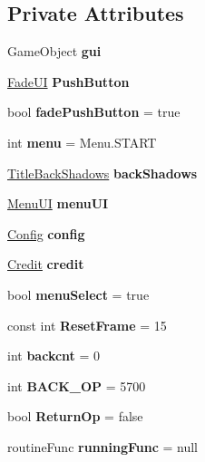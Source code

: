 \subsection*{Private Attributes}
\begin{DoxyCompactItemize}
\item 
\mbox{\label{class_title_acfb1043fc68240498ed922ee90c5c933}} 
Game\+Object {\bfseries gui}
\item 
\mbox{\label{class_title_a0a7333da44745f3f460ddd75d0d77764}} 
\hyperlink{class_fade_u_i}{Fade\+UI} {\bfseries Push\+Button}
\item 
\mbox{\label{class_title_ab6a124bc2664f5909874b2bbfbb1db5e}} 
bool {\bfseries fade\+Push\+Button} = true
\item 
\mbox{\label{class_title_a4e3530b190026013cf56beef7759e167}} 
int {\bfseries menu} = Menu.\+S\+T\+A\+RT
\item 
\mbox{\label{class_title_a6e5192577051a0abb98ab0cd1690491c}} 
\hyperlink{class_title_back_shadows}{Title\+Back\+Shadows} {\bfseries back\+Shadows}
\item 
\mbox{\label{class_title_a6f8dfe1a11190a15a794d89bd58578b2}} 
\hyperlink{class_menu_u_i}{Menu\+UI} {\bfseries menu\+UI}
\item 
\mbox{\label{class_title_aff9b1ff6408029d3fe7271d733237872}} 
\hyperlink{class_config}{Config} {\bfseries config}
\item 
\mbox{\label{class_title_a3bc5f0ec6b3996bdb0695ee34293ab3b}} 
\hyperlink{class_credit}{Credit} {\bfseries credit}
\item 
\mbox{\label{class_title_aaf62b97acaa6303180e6106a7e79a8c8}} 
bool {\bfseries menu\+Select} = true
\item 
\mbox{\label{class_title_ab2a5f4f2ff4b52479b759d6138e83151}} 
const int {\bfseries Reset\+Frame} = 15
\item 
\mbox{\label{class_title_a287e9ad1ee919beb3ed8917e460577b2}} 
int {\bfseries backcnt} = 0
\item 
\mbox{\label{class_title_a9c911c213853d63f0f269ce2db6d99d0}} 
int {\bfseries B\+A\+C\+K\+\_\+\+OP} = 5700
\item 
\mbox{\label{class_title_ad03e0256342887dd02997d420cc024f3}} 
bool {\bfseries Return\+Op} = false
\item 
\mbox{\label{class_title_aeda13f8d2c136bc0dc1cc59aaa846441}} 
routine\+Func {\bfseries running\+Func} = null
\end{DoxyCompactItemize}


